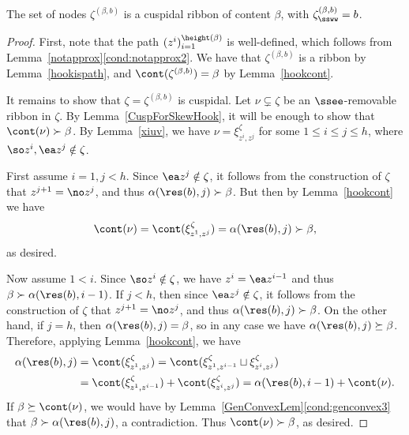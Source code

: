 \begin{lemma}\label{zetaiscusp}
The set of nodes  
\(\zeta^{(\beta,b)}\) is a cuspidal ribbon of content \(\beta\), with \(\zeta^{(\beta,b)}_{\ssww} = b\).
\end{lemma}
\begin{proof}
First, note that the path \((z^i)_{i=1}^{\height(\beta)}\) is well-defined, which follows from Lemma~\ref{notapprox}\eqref{cond:notapprox2}. We have that \(\zeta^{(\beta,b)}\) is a ribbon by Lemma~\ref{hookispath}, and \(\cont(\zeta^{(\beta,b)}) = \beta\) by Lemma~\ref{hookcont}.

It remains to show that \( \zeta = \zeta^{(\beta,b)}\) is cuspidal. Let \(\nu \subsetneq \zeta\) be an \(\ssee\)-removable ribbon in \(\zeta\). By Lemma~\ref{CuspForSkewHook}, it will be enough to show that \(\cont(\nu) \succ \beta\). By Lemma~\ref{xiuv}, we have 
\(\nu = \xi^\zeta_{z^i,z^j}\) for some \(1 \leq i \leq j \leq h\), where \(\so z^i, \ea z^j \notin \zeta\). 


First assume \(i=1, j<h\). Since \(\ea z^j  \notin \zeta\), it follows from the construction of \(\zeta\) that \(z^{j+1} = \no z^j\), and thus \(\alpha(\res(b),j) \succ \beta\). But then by Lemma~\ref{hookcont} we have 
\begin{align*}
\cont(\nu) = \cont(\xi^\zeta_{z^1, z^j}) =  \alpha(\res(b),j) \succ \beta,
\end{align*}
as desired.

Now assume \(1<i\). Since \(\so z^i \notin \zeta\), we have \(z^i = \ea z^{i-1} \) and thus \(\beta \succ \alpha(\res(b), i-1)\). If \(j<h\), then since \(\ea z^j  \notin \zeta\), it follows from the construction of \(\zeta\) that \(z^{j+1} = \no z^j\), and thus \(\alpha(\res(b),j) \succ \beta\). On the other hand, if \(j=h\), then \(\alpha(\res(b),j) = \beta\), so in any case we have \(\alpha(\res(b),j) \succeq \beta\).
Therefore, applying Lemma~\ref{hookcont}, we have
\begin{align*}
\alpha(\res(b), j) &= 
\cont(\xi^\zeta_{z^1, z^j}) 
=\cont(\xi^\zeta_{z^1, z^{i-1}}\sqcup \xi^\zeta_{z^i, z^j})\\
&=
\cont(\xi^\zeta_{z^1, z^{i-1}}) + \cont(\xi^\zeta_{z^i, z^j})
= \alpha(\res(b), i-1) + \cont(\nu).
\end{align*}
If \(\beta \succeq \cont(\nu)\), we would have by Lemma~\ref{GenConvexLem}\eqref{cond:genconvex3} that \(\beta \succ \alpha(\res(b), j)\), a contradiction. Thus \(\cont(\nu) \succ \beta\), as desired.
\end{proof}


